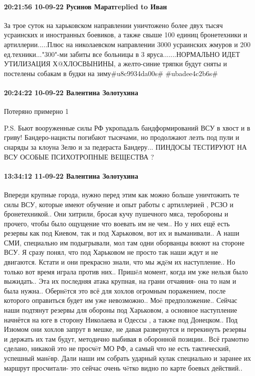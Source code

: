 \paragraph{20:21:56 10-09-22 Русинов Маратreplied to Иван}

За трое суток на харьковском направлении уничтожено более двух тысяч усраинских
и иностранных боевиков, а также свыше 100 единиц бронетехники и
артиллерии.....Плюс на николаевском направлении 3000 усраинских жмуров и 200
ед.техники..."300"-ми забиты все больницы в 3 яруса.......НОРМАЛЬНО ИДЕТ
УТИЛИЗАЦИЯ Х@ХЛОСВЫНИНЫ, а желто-синие тряпки будут сняты и постелены собакам в
будки на зиму#u8c9934da00s# #ubadee4c2b6s#

\paragraph{20:24:22 10-09-22 Валентина Золотухина}

Потеряно примерно 1%

P.S. Бьют вооруженные силы РФ укропадаль бандформирований ВСУ в хвост и в
гриву! Бандеро-нацисты погибают тысячами, но продолжают лезть под пули и
снаряды за клоуна Зелю и за педераста Бандеру... ПИНДОСЫ ТЕСТИРУЮТ НА ВСУ
ОСОБЫЕ ПСИХОТРОПНЫЕ ВЕЩЕСТВА ?


\paragraph{13:34:12 11-09-22 Валентина Золотухина}

Впереди крупные города, нужно перед этим как можно больше уничтожить те силы ВСУ, которые имеют обучение и опыт работы с артиллерией , РСЗО и бронетехникой..
Они хитрили, бросая кучу пушечного мяса, теробороны и прочего, чтобы было ощущение что воевать им не чем..
Но у них ещё есть резервы как под Киевом, так и под Харьковом, вот их и выманивали.. А наши СМИ, специально им подыгрывали, мол там одни оборванцы воюют на стороне ВСУ.
Я сразу понял, что под Харьковом не просто так наши ждут и не двигаются.
Кстати и они прекрасно знали, что мы ждëм их наступление..
Но только вот время играла против них..
Пришëл момент, когда им уже нельзя было выжидать..
Эта их последняя атака крупная, на грани отчаяния- она то нам и была нужна..
Обернëтся это всё для хохлов огромным поражением, после которого оправиться будет им уже невозможно..
Моë предположение..
Сейчас наши подтянут резервы для обороны под Харьковом, а основное наступление начнётся на юге в сторону Николаева и Одессы , а также под Донецком..
Под Изюмом они хохлов запрут в мешке, не давая развернутся и перекинуть резервы и держать их там будут, методично выбивая в оборонной позиции..
Всё грамотно сделано, никакой это не просчëт МО РФ, а самый что не есть тактический, успешный манëвр.
Дали наши им собрать ударный кулак специально и заранее их маршрут просчитали- это сейчас очень чëтко видно по карте боевых действий..

